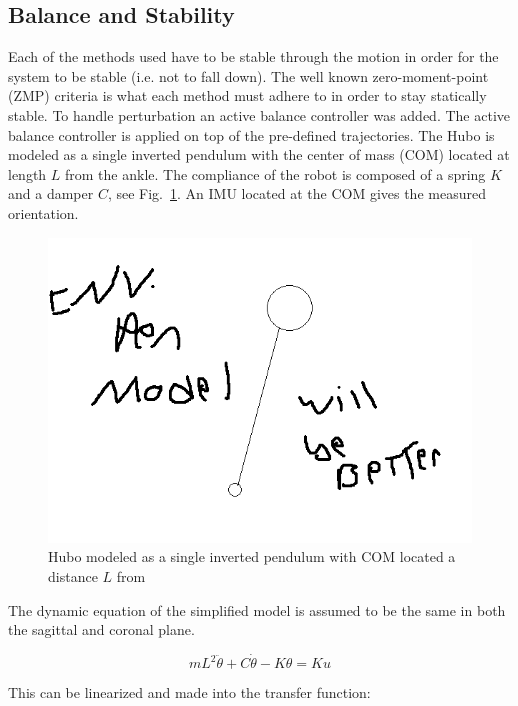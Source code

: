 \subsection{Balance and Stability}\label{sec:sec:balance}
Each of the methods used have to be stable through the motion in order for the system to be stable (i.e. not to fall down).  The well known zero-moment-point (ZMP) criteria is what each method must adhere to in order to stay statically stable\cite{Vukobratovic19721}.  To handle perturbation an active balance controller was added.  The active balance controller is applied on top of the pre-defined trajectories.  The Hubo is modeled as a single inverted pendulum with the center of mass (COM) located at length $L$ from the ankle.  The compliance of the robot is composed of a spring $K$ and a damper $C$, see Fig.~\ref{fig:invPen}.  An IMU located at the COM gives the measured orientation.

\begin{figure}[t]
  \centering
\includegraphics[width=1.0\columnwidth]{./pix/invPen.png}
  \caption{Hubo modeled as a single inverted pendulum with COM located a distance $L$ from }
  \label{fig:invPen}
\end{figure}

The dynamic equation of the simplified model is assumed to be the same in both the sagittal and coronal plane.

\begin{equation}
mL^2\ddot{\theta}+C\dot{\theta}-K\theta = Ku
\end{equation}

This can be linearized and made into the transfer function:

